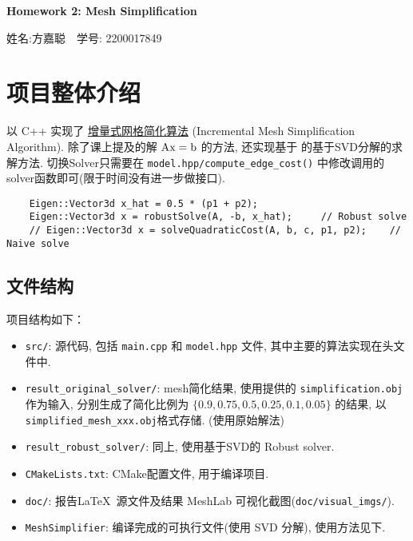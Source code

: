 \documentclass[11pt]{article}
\newcommand\1{\mathds{1}}
\begin{document}
\pagestyle{fancy}
\chead{}
\fancyfoot[R]{} 
\fancyfoot[C]{\thepage\ /\ \pageref{LastPage} \\ \textcolor{lightgray}{最后编译时间: \today}}


\begin{center}
    {\LARGE \bf Homework 2: Mesh Simplification} 

    {\kaishu 姓名:方嘉聪\ \  学号: 2200017849}            %
\end{center}
\section{项目整体介绍}
以 C++ 实现了 \underline{增量式网格简化算法} \cite{QEM} (Incremental Mesh Simplification Algorithm). 
除了课上提及的解 $\rm A x = b$ 的方法, 还实现基于 \cite{Robust} 的基于SVD分解的求解方法. 切换Solver只需要在
\texttt{model.hpp/compute\_edge\_cost()} 中修改调用的solver函数即可(限于时间没有进一步做接口).
\begin{verbatim}
    Eigen::Vector3d x_hat = 0.5 * (p1 + p2);
    Eigen::Vector3d x = robustSolve(A, -b, x_hat);     // Robust solve
    // Eigen::Vector3d x = solveQuadraticCost(A, b, c, p1, p2);    // Naive solve
\end{verbatim}
\subsection{文件结构}
项目结构如下：
\begin{itemize}
    \item \texttt{src/}: 源代码, 包括 \texttt{main.cpp} 和 \texttt{model.hpp} 文件, 其中主要的算法实现在头文件中.
    \item \texttt{result\_original\_solver/}: mesh简化结果, 使用提供的 \texttt{simplification.obj} 作为输入, 分别生成了简化比例为 $\{0.9, 0.75, 0.5, 0.25, 0.1, 0.05\}$ 的结果, 以\texttt{simplified\_mesh\_xxx.obj}格式存储. (使用原始解法)
    \item \texttt{result\_robust\_solver/}: 同上, 使用基于SVD的 Robust solver.
    \item \texttt{CMakeLists.txt}: CMake配置文件, 用于编译项目.
    \item \texttt{doc/}: 报告\LaTeX\ 源文件及结果 MeshLab 可视化截图(\texttt{doc/visual\_imgs/}).
    \item \texttt{MeshSimplifier}: 编译完成的可执行文件(使用 SVD 分解), 使用方法见下.
\end{itemize}
\end{document}
